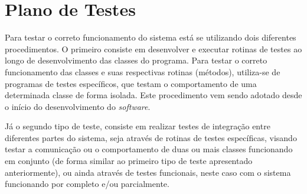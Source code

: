 %
%
%
%
%

%
%
%
%
%

\section{Plano de Testes} \label{sec:test_plan}

Para testar o correto funcionamento do sistema está se utilizando dois diferentes procedimentos. O primeiro consiste em desenvolver e executar rotinas de testes ao longo de desenvolvimento das classes do programa. Para testar o correto funcionamento das classes e suas respectivas rotinas (métodos), utiliza-se de programas de testes específicos, que testam o comportamento de uma determinada classe de forma isolada. Este procedimento vem sendo adotado desde o início do desenvolvimento do \textit{software}.

Já o segundo tipo de teste, consiste em realizar testes de integração entre diferentes partes do sistema, seja através de rotinas de testes específicas, visando testar a comunicação ou o comportamento de duas ou mais classes funcionando em conjunto (de forma similar ao primeiro tipo de teste apresentado anteriormente), ou ainda através de testes funcionais, neste caso com o sistema funcionando por completo e/ou parcialmente.
